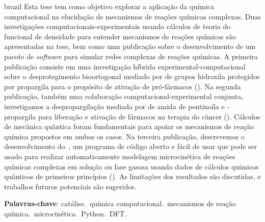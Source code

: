 \setlength{\absparsep}{18pt} %

\begin{resumo}[Resumo]
	\begin{otherlanguage*}{brazil}
		Esta tese tem como objetivo explorar a aplicação da química computacional na elucidação de mecanismos de reações químicas complexas.
		Duas investigações computacionais-experimentais usando cálculos de teoria do funcional de densidade para entender mecanismos de reações químicas são apresentadas na tese,
		bem como uma publicação sobre o desenvolvimento de um pacote de \emph{software} para simular redes complexas de reações químicas.
		A primeira publicação consiste em uma investigação híbrida experimental-computacional sobre o desprotegimento bioortogonal mediado por  de grupos hidroxila protegidos por propargila para o propósito de ativação de pró-fármacos
		().
		Na segunda publicação,
		também uma colaboração computacional-experimental conjunta,
		investigamos a despropargilação mediada por  de amida de pentinoíla e -propargila para liberação e ativação de fármacos na terapia do câncer
		().
		Cálculos de mecânica quântica foram fundamentais para apoiar os mecanismos de reação química propostos em ambos os casos.
		Na terceira publicação,
		descrevemos o desenvolvimento do~\overreact{},
		um programa de código aberto e fácil de usar que pode ser usado
		para realizar automaticamente modelagem microcinética de reações químicas complexas em solução ou fase gasosa
		usando dados de cálculos químicos quânticos de primeiros princípios
		().
		As limitações dos resultados são discutidas,
		e trabalhos futuros potenciais são sugeridos.

		\vspace{\onelineskip}

		\noindent
		\textbf{Palavras-chave}:
		catálise.\ química computacional.\ mecanismos de reação química.\ microcinética.\ Python.\ DFT.\@
	\end{otherlanguage*}
\end{resumo}

